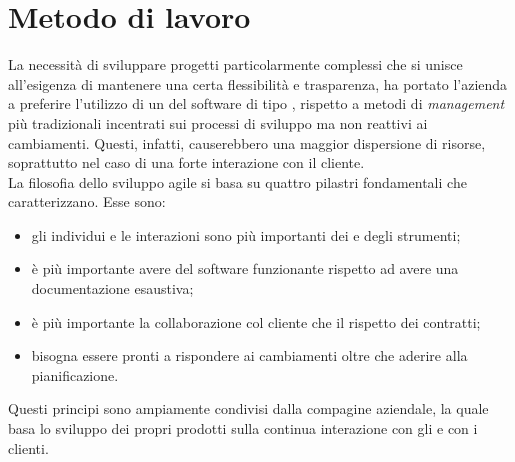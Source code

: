 \section{Metodo di lavoro}
La necessità di sviluppare progetti particolarmente complessi che si unisce all'esigenza di mantenere una certa flessibilità e trasparenza, ha portato l'azienda a preferire l'utilizzo di un  del software di tipo , rispetto a metodi di \emph{management} più tradizionali incentrati sui processi di sviluppo ma non reattivi ai cambiamenti. Questi, infatti, causerebbero una maggior dispersione di risorse, soprattutto nel caso di una forte interazione con il cliente.\\
La filosofia dello sviluppo agile si basa su quattro pilastri fondamentali che caratterizzano.  Esse sono:
\begin{itemize}
	\item gli individui e le interazioni sono più importanti dei  e degli strumenti;
	\item è più importante avere del software funzionante rispetto ad avere una documentazione esaustiva;
	\item è più importante la collaborazione col cliente che il rispetto dei contratti;
	\item bisogna essere pronti a rispondere ai cambiamenti oltre che aderire alla pianificazione.
\end{itemize}
Questi principi sono ampiamente condivisi dalla compagine aziendale, la quale basa lo sviluppo dei propri prodotti sulla continua interazione con gli  e con i clienti.

